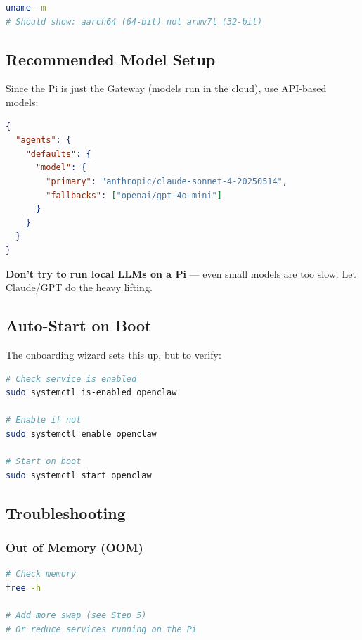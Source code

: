 \begin{lstlisting}[language=bash]
uname -m
# Should show: aarch64 (64-bit) not armv7l (32-bit)
\end{lstlisting}


\hrulefill


\subsection{Recommended Model Setup}


Since the Pi is just the Gateway (models run in the cloud), use API-based models:

\begin{lstlisting}[language=json]
{
  "agents": {
    "defaults": {
      "model": {
        "primary": "anthropic/claude-sonnet-4-20250514",
        "fallbacks": ["openai/gpt-4o-mini"]
      }
    }
  }
}
\end{lstlisting}


\textbf{Don't try to run local LLMs on a Pi} — even small models are too slow. Let Claude/GPT do the heavy lifting.

\hrulefill


\subsection{Auto-Start on Boot}


The onboarding wizard sets this up, but to verify:

\begin{lstlisting}[language=bash]
# Check service is enabled
sudo systemctl is-enabled openclaw

# Enable if not
sudo systemctl enable openclaw

# Start on boot
sudo systemctl start openclaw
\end{lstlisting}


\hrulefill


\subsection{Troubleshooting}


\subsubsection{Out of Memory (OOM)}


\begin{lstlisting}[language=bash]
# Check memory
free -h

# Add more swap (see Step 5)
# Or reduce services running on the Pi
\end{lstlisting}


